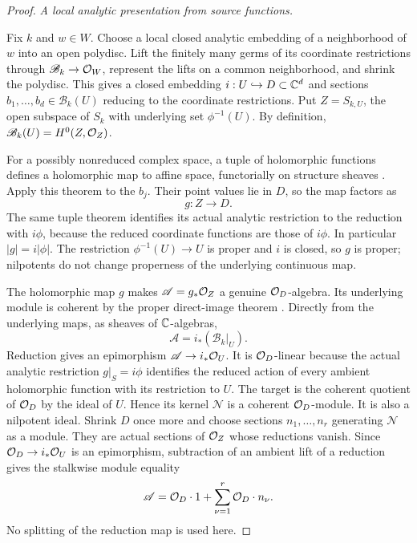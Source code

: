 \begin{proof}
\par\medskip\noindent\textit{A local analytic presentation from source functions.}\par
Fix \(k\) and \(w\in W\).  Choose a local closed analytic embedding
of a neighborhood of \(w\) into an open polydisc.  Lift the finitely
many germs of its coordinate restrictions through
\(\mathscr B_k\to\mathcal O_W\), represent the lifts on a common
neighborhood, and shrink the polydisc.  This gives a closed embedding
\(i:U\hookrightarrow D\subset\mathbb C^d\) and sections
\(b_1,\ldots,b_d\in\mathscr B_k(U)\) reducing to the coordinate
restrictions.  Put \(Z=S_{k,U}\), the open subspace of \(S_k\) with
underlying set \(\phi^{-1}(U)\).  By definition,
\(\mathscr B_k(U)=H^0(Z,\mathcal O_Z)\).

For a possibly nonreduced complex space, a tuple of holomorphic
functions defines a holomorphic map to affine space, functorially on
structure sheaves \cite[Theorem~1.1, p.~10-02]{Grothendieck1961TechniquesIII}.
Apply this theorem to the \(b_j\).  Their point values lie in \(D\),
so the map factors as
\[
 g:Z\longrightarrow D.
\]
The same tuple theorem identifies its actual analytic restriction to
the reduction with \(i\phi\), because the reduced coordinate functions
are those of \(i\phi\).  In particular \(|g|=i|\phi|\).  The
restriction \(\phi^{-1}(U)\to U\) is proper and \(i\) is closed, so
\(g\) is proper; nilpotents do not change properness of the underlying
continuous map.

The holomorphic map \(g\) makes
\(\mathscr A=g_*\mathcal O_Z\) a genuine \(\mathcal O_D\)-algebra.  Its underlying
module is coherent by the proper direct-image theorem
\cite[Theorem~1.1]{Grothendieck1961TechniquesVIII}.  Directly from the
underlying maps, as sheaves of \(\mathbb C\)-algebras,
\[
 \mathscr A=i_*(\mathscr B_k|_U).
\]
Reduction gives an epimorphism
\(\mathscr A\to i_*\mathcal O_U\).  It is \(\mathcal O_D\)-linear because the
actual analytic restriction \(g|_S=i\phi\) identifies the reduced
action of every ambient holomorphic function with its restriction to
\(U\).  The target is the coherent quotient of \(\mathcal O_D\) by the
ideal of \(U\).  Hence its kernel \(\mathscr N\) is a coherent
\(\mathcal O_D\)-module.  It is also a nilpotent ideal.  Shrink \(D\) once
more and choose sections \(n_1,\ldots,n_r\) generating
\(\mathscr N\) as a module.  They are actual sections of \(\mathcal O_Z\)
whose reductions vanish.  Since \(\mathcal O_D\to i_*\mathcal O_U\) is an
epimorphism, subtraction of an ambient lift of a reduction gives the
stalkwise module equality
\begin{equation}\label{eq:analytic-module-generation}
 \mathscr A=\mathcal O_D\cdot1+
              \sum_{\nu=1}^r\mathcal O_D\cdot n_\nu.
\end{equation}
No splitting of the reduction map is used here.


\end{proof}
